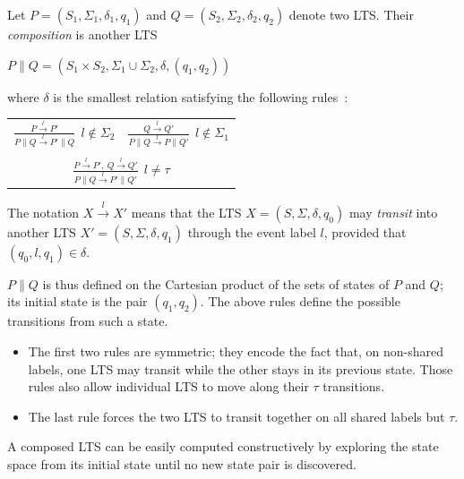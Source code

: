 \begin{definition}
Let $P = (S_1,\Sigma_1,\delta_1,q_{1})$ and $Q = (S_2,\Sigma_2,\delta_2,q_{2})$ denote two LTS. Their \emph{composition} is another LTS 
\begin{center}
$P \parallel Q = (S_1 \times S_2,\Sigma_1\cup\Sigma_2,\delta,(q_1,q_2))$
\end{center}
\noindent where $\delta$ is the smallest relation satisfying the following rules~\cite{Giannakopoulou:1999}:

\begin{center}
\begin{tabular}{cc}
$\frac{\displaystyle P \stackrel{l}{\longrightarrow} P'}{\displaystyle P \parallel Q \stackrel{l}{\longrightarrow} P' \parallel Q}~~l \notin \Sigma_2$ &
$\frac{\displaystyle Q \stackrel{l}{\longrightarrow} Q'}{\displaystyle P \parallel Q \stackrel{l}{\longrightarrow} P \parallel Q'}~~l \notin \Sigma_1$ \\
 & \\
\multicolumn{2}{c}{$\frac{\displaystyle P \stackrel{l}{\longrightarrow} P',~Q \stackrel{l}{\longrightarrow} Q'}{\displaystyle P \parallel Q \stackrel{l}{\longrightarrow} P' \parallel Q'}~~l \neq \tau$} \\
\end{tabular}
\end{center}
The notation $X \stackrel{l}{\longrightarrow} X'$ means that the LTS $X = (S,\Sigma,\delta,q_0)$ may \emph{transit} into another LTS $X' = (S,\Sigma,\delta,q_1)$ through the event label $l$, provided that $(q_0,l,q_1) \in \delta$. 
\label{definition:lts-composition}
\end{definition}

$P \parallel Q$ is thus defined on the Cartesian product of the sets of states of $P$ and $Q$; its initial state is the pair $(q_1,q_2)$. The above rules define the possible transitions from such a state. 

\begin{itemize}
\item The first two rules are symmetric; they encode the fact that, on non-shared labels, one LTS may transit while the other stays in its previous state. Those rules also allow individual LTS to move along their $\tau$ transitions. 
\item The last rule forces the two LTS to transit together on all shared labels but $\tau$.
\end{itemize}

A composed LTS can be easily computed constructively by exploring the state space from its initial state until no new state pair is discovered. 

